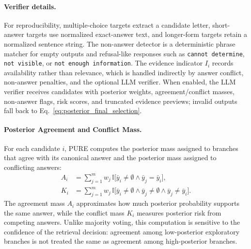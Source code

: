 \documentclass[a4paper,fleqn]{cas-dc}
\begin{document}
\paragraph{Verifier details.}
For reproducibility, multiple-choice targets extract a candidate letter, short-answer targets use normalized exact-answer text, and longer-form targets retain a normalized sentence string. The non-answer detector is a deterministic phrase matcher for empty outputs and refusal-like responses such as \texttt{cannot determine}, \texttt{not visible}, or \texttt{not enough information}. The evidence indicator $I_i$ records availability rather than relevance, which is handled indirectly by answer conflict, non-answer penalties, and the optional LLM verifier. When enabled, the LLM verifier receives candidates with posterior weights, agreement/conflict masses, non-answer flags, risk scores, and truncated evidence previews; invalid outputs fall back to Eq.~\eqref{eq:posterior_final_selection}.

\paragraph{Posterior Agreement and Conflict Mass.}
For each candidate $i$, PURE computes the posterior mass assigned to branches that agree with its canonical answer and the posterior mass assigned to conflicting answers:
\begin{equation}
\label{eq:posterior_agreement_conflict}
\begin{aligned}
A_i
&=
\sum_{j=1}^{m}
w_j\,
\mathbb{I}\big[
\bar{y}_i\ne\emptyset
\wedge
\bar{y}_j=\bar{y}_i
\big],\\
K_i
&=
\sum_{j=1}^{m}
w_j\,
\mathbb{I}\big[
\bar{y}_i\ne\emptyset
\wedge
\bar{y}_j\ne\emptyset
\wedge
\bar{y}_j\ne\bar{y}_i
\big].
\end{aligned}
\end{equation}
The agreement mass $A_i$ approximates how much posterior probability supports the same answer, while the conflict mass $K_i$ measures posterior risk from competing answers. Unlike majority voting, this computation is sensitive to the confidence of the retrieval decision: agreement among low-posterior exploratory branches is not treated the same as agreement among high-posterior branches.
\end{document}
